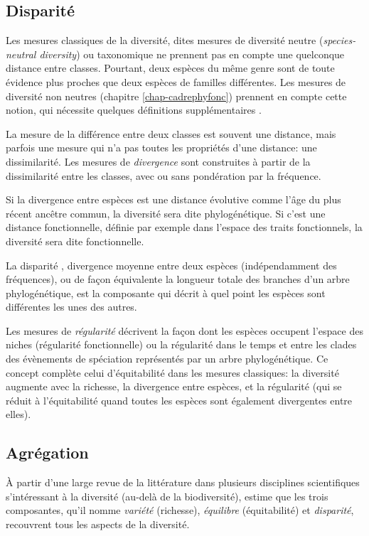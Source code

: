 \documentclass[
  11pt,
  american,
  a4paper,
  extrafontsizes,onecolumn,openright
  ]{memoir}
\newlength{\rf}
\begin{document}
\subsection{Disparité}\label{disparituxe9}

Les mesures classiques de la diversité, dites mesures de diversité neutre (\emph{species-neutral diversity}) ou taxonomique ne prennent pas en compte une quelconque distance entre classes.
Pourtant, deux espèces du même genre sont de toute évidence plus proches que deux espèces de familles différentes.
Les mesures de diversité non neutres (chapitre \ref{chap-cadrephyfonc}) prennent en compte cette notion, qui nécessite quelques définitions supplémentaires \autocite{Mouillot2005,Ricotta2007}.

La mesure de la différence entre deux classes est souvent une distance, mais parfois une mesure qui n'a pas toutes les propriétés d'une distance: une dissimilarité.
Les mesures de \emph{divergence} \autocite{Pavoine2011} sont construites à partir de la dissimilarité entre les classes, avec ou sans pondération par la fréquence.

Si la divergence entre espèces est une distance évolutive comme l'âge du plus récent ancêtre commun, la diversité sera dite phylogénétique.
Si c'est une distance fonctionnelle, définie par exemple dans l'espace des traits fonctionnels, la diversité sera dite fonctionnelle.

La disparité \autocite{Runnegar1987}, divergence moyenne entre deux espèces (indépendamment des fréquences), ou de façon équivalente la longueur totale des branches d'un arbre phylogénétique, est la composante qui décrit à quel point les espèces sont différentes les unes des autres.

Les mesures de \emph{régularité} décrivent la façon dont les espèces occupent l'espace des niches (régularité fonctionnelle) ou la régularité dans le temps et entre les clades des évènements de spéciation représentés par un arbre phylogénétique.
Ce concept complète celui d'équitabilité dans les mesures classiques: la diversité augmente avec la richesse, la divergence entre espèces, et la régularité (qui se réduit à l'équitabilité quand toutes les espèces sont également divergentes entre elles).

\subsection{Agrégation}\label{agruxe9gation}

À partir d'une large revue de la littérature dans plusieurs disciplines scientifiques s'intéressant à la diversité (au-delà de la biodiversité), \textcite{Stirling2007} estime que les trois composantes, qu'il nomme \emph{variété} (richesse), \emph{équilibre} (équitabilité) et \emph{disparité}, recouvrent tous les aspects de la diversité.
\end{document}
